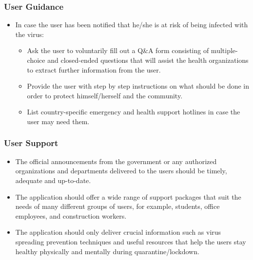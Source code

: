       \subsubsection{User Guidance}
        \begin{itemize}
          \item In case the user has been notified that he/she is at risk of being infected with the virus:
            \begin{itemize}
              \item Ask the user to voluntarily fill out a Q\&A form consisting of multiple-choice and closed-ended questions that will assist the health organizations to extract further information from the user.
              \item Provide the user with step by step instructions on what should be done in order to protect himself/herself and the community.
              \item List country-specific emergency and health support hotlines in case the user may need them.
            \end{itemize}
        \end{itemize}
    
      \subsubsection{User Support}
        \begin{itemize}
          \item The official announcements from the government or any authorized organizations and departments delivered to the users should be timely, adequate and up-to-date.
          \item The application should offer a wide range of support packages that suit the needs of many different groups of users, for example, students, office employees, and construction workers.
          \item The application should only deliver crucial information such as virus spreading prevention techniques and useful resources that help the users stay healthy physically and mentally during quarantine/lockdown.
        \end{itemize}
    
